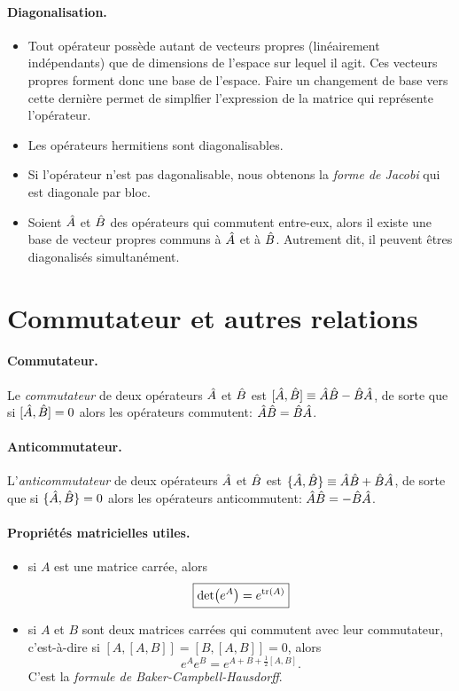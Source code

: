 \documentclass[11pt,a4paper,oneside]{article}
\begin{document}
\paragraph{Diagonalisation.} 
\begin{itemize}[label=\tb]
    \item Tout opérateur possède autant de vecteurs propres (linéairement indépendants) que de dimensions de l'espace sur lequel il agit. Ces vecteurs propres forment donc une base de l'espace. Faire un changement de base vers cette dernière permet de simplfier l'expression de la matrice qui représente l'opérateur.
    \item Les opérateurs hermitiens sont diagonalisables.
    \item Si l'opérateur n'est pas dagonalisable, nous obtenons la \emph{forme de Jacobi} qui est diagonale par bloc.
    \item Soient $\hat{A}$ et $\hat{B}$ des opérateurs qui commutent entre-eux, alors il existe une base de vecteur propres communs à $\hat{A}$ et à $\hat{B}$. Autrement dit, il peuvent êtres diagonalisés simultanément.
\end{itemize}


\section{Commutateur et autres relations}

\paragraph{Commutateur.} Le \emph{commutateur} de deux opérateurs $\hat{A}$ et $\hat{B}$ est $[\hat{A},\hat{B}]\equiv \hat{A}\hat{B}-\hat{B}\hat{A}$, de sorte que si $[\hat{A},\hat{B}]=0$ alors les opérateurs commutent: $\hat{A}\hat{B}=\hat{B}\hat{A}$.

\paragraph{Anticommutateur.} L'\emph{anticommutateur} de deux opérateurs $\hat{A}$ et $\hat{B}$ est $\{\hat{A},\hat{B}\}\equiv \hat{A}\hat{B}+\hat{B}\hat{A}$, de sorte que si $\{\hat{A},\hat{B}\}=0$ alors les opérateurs anticommutent: $\hat{A}\hat{B}=-\hat{B}\hat{A}$.

\paragraph{Propriétés matricielles utiles.}
\begin{itemize}[label=\tb]
    \item si $A$ est une matrice carrée, alors
    \begin{equation}
        \boxed{\det(e^A)=e^{\tr(A)}}
    \end{equation}
    \item si $A$ et $B$ sont deux matrices carrées qui commutent avec leur commutateur, c'est-à-dire si $[A,[A,B]]=[B,[A,B]]=0$, alors
    \begin{equation}
        \boxed{e^Ae^B = e^{A+B+\frac{1}{2}[A,B]}}.
    \end{equation}
    C'est la \emph{formule de Baker-Campbell-Hausdorff}.
\end{itemize}
\end{document}
